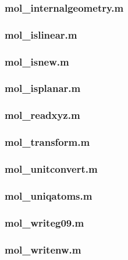 \documentclass[a4paper]{article}
\begin{document}
\subsubsection{mol\_internalgeometry.m%
  \label{mol-internalgeometry-m}%
}


\subsubsection{mol\_islinear.m%
  \label{mol-islinear-m}%
}


\subsubsection{mol\_isnew.m%
  \label{mol-isnew-m}%
}


\subsubsection{mol\_isplanar.m%
  \label{mol-isplanar-m}%
}


\subsubsection{mol\_readxyz.m%
  \label{mol-readxyz-m}%
}


\subsubsection{mol\_transform.m%
  \label{mol-transform-m}%
}


\subsubsection{mol\_unitconvert.m%
  \label{mol-unitconvert-m}%
}


\subsubsection{mol\_uniqatoms.m%
  \label{mol-uniqatoms-m}%
}


\subsubsection{mol\_writeg09.m%
  \label{mol-writeg09-m}%
}


\subsubsection{mol\_writenw.m%
  \label{mol-writenw-m}%
}
\end{document}
